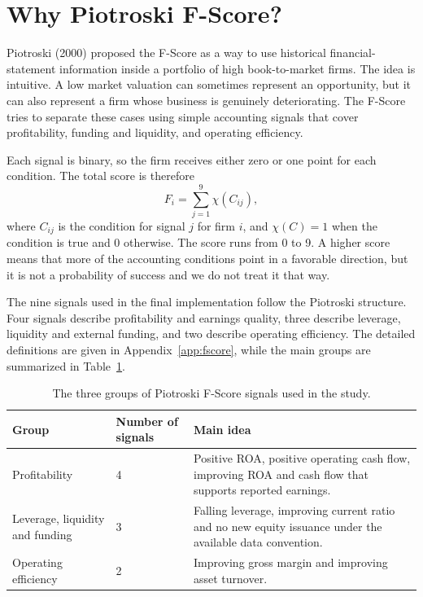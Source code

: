 \documentclass[11pt,a4paper]{report}
\numberwithin{figure}{chapter}
\numberwithin{table}{chapter}
\numberwithin{equation}{chapter}
\begin{document}
\section{Why Piotroski F-Score?}

Piotroski (2000) proposed the F-Score as a way to use historical financial-statement information inside a portfolio of high book-to-market firms. The idea is intuitive. A low market valuation can sometimes represent an opportunity, but it can also represent a firm whose business is genuinely deteriorating. The F-Score tries to separate these cases using simple accounting signals that cover profitability, funding and liquidity, and operating efficiency.

Each signal is binary, so the firm receives either zero or one point for each condition. The total score is therefore
\begin{equation}
F_i = \sum_{j=1}^{9} \chi\left(C_{ij}\right),
\label{eq:fscore_general}
\end{equation}
where $C_{ij}$ is the condition for signal $j$ for firm $i$, and $\chi(C)=1$ when the condition is true and $0$ otherwise. The score runs from 0 to 9. A higher score means that more of the accounting conditions point in a favorable direction, but it is not a probability of success and we do not treat it that way.

The nine signals used in the final implementation follow the Piotroski structure. Four signals describe profitability and earnings quality, three describe leverage, liquidity and external funding, and two describe operating efficiency. The detailed definitions are given in Appendix~\ref{app:fscore}, while the main groups are summarized in Table~\ref{tab:fscore_groups}.

\begin{table}[H]
\centering
\scriptsize
\caption{The three groups of Piotroski F-Score signals used in the study.}
\label{tab:fscore_groups}
\begin{tabularx}{0.92\textwidth}{p{} p{} X}
\hline
\textbf{Group} & \textbf{Number of signals} & \textbf{Main idea} \\
\hline
Profitability & 4 & Positive ROA, positive operating cash flow, improving ROA and cash flow that supports reported earnings. \\
Leverage, liquidity and funding & 3 & Falling leverage, improving current ratio and no new equity issuance under the available data convention. \\
Operating efficiency & 2 & Improving gross margin and improving asset turnover. \\
\hline
\end{tabularx}
\end{table}
\end{document}
